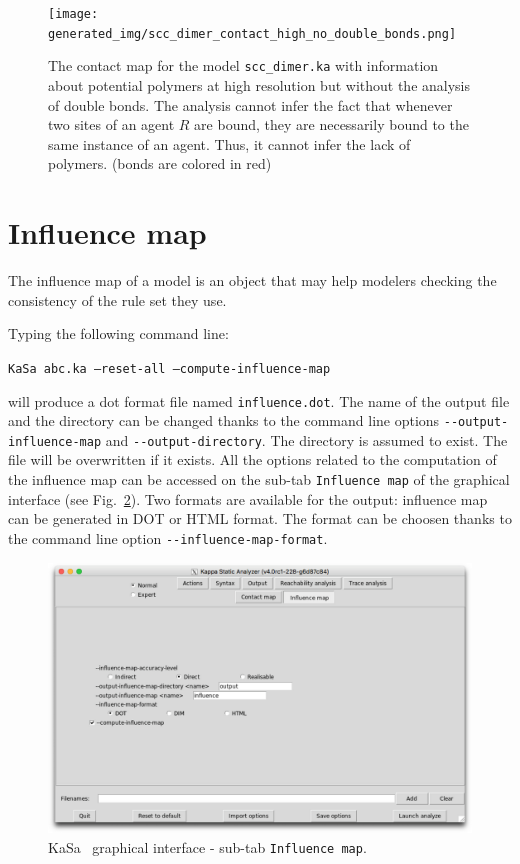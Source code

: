 \documentclass[11pt]{book}
\def\KaSa{\textsf{KaSa}}
\begin{document}
\begin{figure}[htbp]
\centering
\texttt{[image: generated\_img/scc\_dimer\_contact\_high\_no\_double\_bonds.png]}
\caption{The contact map for the model \texttt{scc\_dimer.ka} with information about potential polymers at high resolution but without the analysis of double bonds. The analysis cannot infer the fact that whenever two sites of an agent $R$ are bound, they are necessarily bound to the same instance of an agent. Thus, it cannot infer the lack of polymers. (bonds are colored in red)}
\label{fig:scc-dimer-high-no-double}
\end{figure}

\section{Influence map}

The influence map of a model is an object that may help modelers checking the consistency of the rule set they use.

Typing the following command line:

\texttt{KaSa abc.ka --reset-all --compute-influence-map}

will produce a dot format file named \texttt{influence.dot}.
The name of the output file and the directory can be changed thanks to the command line options \texttt{-{}-output-influence-map} and \texttt{-{}-output-directory}.
The directory is assumed to exist. The file will be overwritten if it exists.  All the options related to the computation of the influence map can be accessed on the sub-tab \texttt{Influence map} of the graphical interface (see Fig.~\ref{fig:kasa:5}). Two formats are available for the output: influence map can be generated in DOT or HTML format. The format can be choosen thanks to the command line option \texttt{-{}-influence-map-format}.

\begin{figure}[htbp]
\centering
\includegraphics[width=12cm]{img/kasa_6.png}
\caption{\KaSa~ graphical interface - sub-tab \texttt{Influence map}.}
\label{fig:kasa:5}
\end{figure}
\end{document}
